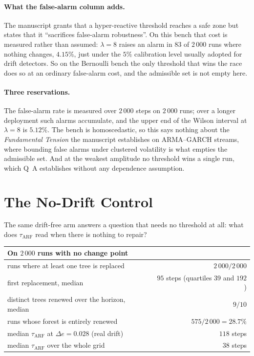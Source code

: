 \documentclass[11pt,a4paper]{article}
\begin{document}
\paragraph{What the false-alarm column adds.} The manuscript grants that a hyper-reactive
threshold reaches a safe zone but states that it ``sacrifices false-alarm robustness''. On
this bench that cost is measured rather than assumed: $\lambda = 8$ raises an alarm in
$83$ of $2\,000$ runs where nothing changes, $4.15\%$, just under the $5\%$ calibration level usually adopted for
drift detectors. So on the Bernoulli bench the only threshold that wins the race does so at
an ordinary false-alarm cost, and the admissible set is not empty here.

\paragraph{Three reservations.} The false-alarm rate is measured over $2\,000$ steps on
$2\,000$ runs; over a longer deployment such alarms accumulate, and the upper end of the
Wilson interval at $\lambda = 8$ is $5.12\%$. The bench is homoscedastic, so this says
nothing about the \emph{Fundamental Tension} the manuscript establishes on
ARMA--GARCH streams, where bounding false alarms under clustered volatility is what empties
the admissible set. And at the weakest amplitude no threshold wins a single run, which
Q~A establishes without any dependence assumption.

\section{The No-Drift Control}

The same drift-free arm answers a question that needs no threshold at all: what does
$\tau_{\mathrm{ARF}}$ read when there is nothing to repair?

\begin{center}
\begin{tabular}{lr}
\toprule
On $2\,000$ runs with no change point & \\
\midrule
runs where at least one tree is replaced & $2\,000/2\,000$ \\
first replacement, median & $95$ steps (quartiles $39$ and $192$) \\
distinct trees renewed over the horizon, median & $9/10$ \\
runs whose forest is entirely renewed & $575/2\,000 = 28.7\%$ \\
\midrule
median $\tau_{\mathrm{ARF}}$ at $\Delta e = 0.028$ (real drift) & $118$ steps \\
median $\tau_{\mathrm{ARF}}$ over the whole grid & $38$ steps \\
\bottomrule
\end{tabular}
\end{center}
\end{document}
